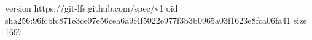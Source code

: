 version https://git-lfs.github.com/spec/v1
oid sha256:96fcbfc871e3ce97e56cea6a9f4f5022e977f3b3b0965a03f1623e8fca06fa41
size 1697
